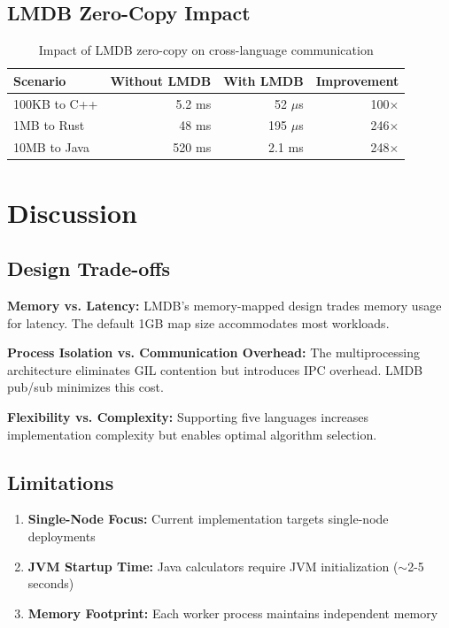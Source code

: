\documentclass[11pt,a4paper]{article}
\begin{document}
\subsection{LMDB Zero-Copy Impact}

\begin{table}[H]
\centering
\caption{Impact of LMDB zero-copy on cross-language communication}
\begin{tabular}{@{}lrrr@{}}
\toprule
\textbf{Scenario} & \textbf{Without LMDB} & \textbf{With LMDB} & \textbf{Improvement} \\
\midrule
100KB to C++ & 5.2 ms & 52 $\mu$s & 100$\times$ \\
1MB to Rust & 48 ms & 195 $\mu$s & 246$\times$ \\
10MB to Java & 520 ms & 2.1 ms & 248$\times$ \\
\bottomrule
\end{tabular}
\end{table}

\section{Discussion}

\subsection{Design Trade-offs}

\textbf{Memory vs. Latency:} LMDB's memory-mapped design trades memory usage for latency. The default 1GB map size accommodates most workloads.

\textbf{Process Isolation vs. Communication Overhead:} The multiprocessing architecture eliminates GIL contention but introduces IPC overhead. LMDB pub/sub minimizes this cost.

\textbf{Flexibility vs. Complexity:} Supporting five languages increases implementation complexity but enables optimal algorithm selection.

\subsection{Limitations}

\begin{enumerate}
    \item \textbf{Single-Node Focus:} Current implementation targets single-node deployments
    \item \textbf{JVM Startup Time:} Java calculators require JVM initialization ($\sim$2-5 seconds)
    \item \textbf{Memory Footprint:} Each worker process maintains independent memory
\end{enumerate}
\end{document}
